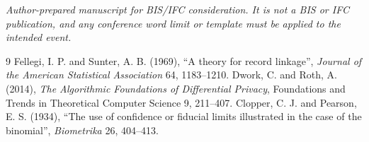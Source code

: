 \documentclass[10pt,a4paper]{article}
\begin{document}
\vspace{3mm}\noindent\emph{Author-prepared manuscript for BIS/IFC consideration. It is not a BIS or IFC publication, and any conference word limit or template must be applied to the intended event.}
\begin{thebibliography}{9}\small
{} Fellegi, I. P. and Sunter, A. B. (1969), ``A theory for record linkage'', \emph{Journal of the American Statistical Association} 64, 1183--1210.
 Dwork, C. and Roth, A. (2014), \emph{The Algorithmic Foundations of Differential Privacy}, Foundations and Trends in Theoretical Computer Science 9, 211--407.
 Clopper, C. J. and Pearson, E. S. (1934), ``The use of confidence or fiducial limits illustrated in the case of the binomial'', \emph{Biometrika} 26, 404--413.
\end{thebibliography}
\end{document}
